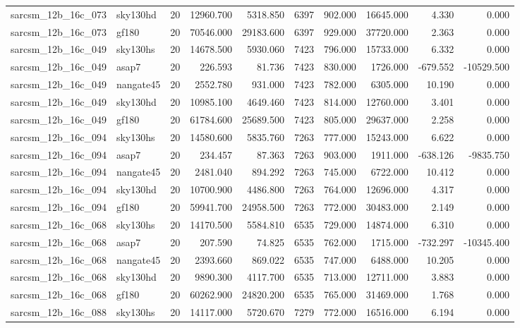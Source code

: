\begin{longtable}{llrrrrrrrr}
sarcsm\_12b\_16c\_073 & sky130hd & 20 & 12960.700 & 5318.850 & 6397 & 902.000 & 16645.000 & 4.330 & 0.000 \\
sarcsm\_12b\_16c\_073 & gf180 & 20 & 70546.000 & 29183.600 & 6397 & 929.000 & 37720.000 & 2.363 & 0.000 \\
sarcsm\_12b\_16c\_049 & sky130hs & 20 & 14678.500 & 5930.060 & 7423 & 796.000 & 15733.000 & 6.332 & 0.000 \\
sarcsm\_12b\_16c\_049 & asap7 & 20 & 226.593 & 81.736 & 7423 & 830.000 & 1726.000 & -679.552 & -10529.500 \\
sarcsm\_12b\_16c\_049 & nangate45 & 20 & 2552.780 & 931.000 & 7423 & 782.000 & 6305.000 & 10.190 & 0.000 \\
sarcsm\_12b\_16c\_049 & sky130hd & 20 & 10985.100 & 4649.460 & 7423 & 814.000 & 12760.000 & 3.401 & 0.000 \\
sarcsm\_12b\_16c\_049 & gf180 & 20 & 61784.600 & 25689.500 & 7423 & 805.000 & 29637.000 & 2.258 & 0.000 \\
sarcsm\_12b\_16c\_094 & sky130hs & 20 & 14580.600 & 5835.760 & 7263 & 777.000 & 15243.000 & 6.622 & 0.000 \\
sarcsm\_12b\_16c\_094 & asap7 & 20 & 234.457 & 87.363 & 7263 & 903.000 & 1911.000 & -638.126 & -9835.750 \\
sarcsm\_12b\_16c\_094 & nangate45 & 20 & 2481.040 & 894.292 & 7263 & 745.000 & 6722.000 & 10.412 & 0.000 \\
sarcsm\_12b\_16c\_094 & sky130hd & 20 & 10700.900 & 4486.800 & 7263 & 764.000 & 12696.000 & 4.317 & 0.000 \\
sarcsm\_12b\_16c\_094 & gf180 & 20 & 59941.700 & 24958.500 & 7263 & 772.000 & 30483.000 & 2.149 & 0.000 \\
sarcsm\_12b\_16c\_068 & sky130hs & 20 & 14170.500 & 5584.810 & 6535 & 729.000 & 14874.000 & 6.310 & 0.000 \\
sarcsm\_12b\_16c\_068 & asap7 & 20 & 207.590 & 74.825 & 6535 & 762.000 & 1715.000 & -732.297 & -10345.400 \\
sarcsm\_12b\_16c\_068 & nangate45 & 20 & 2393.660 & 869.022 & 6535 & 747.000 & 6488.000 & 10.205 & 0.000 \\
sarcsm\_12b\_16c\_068 & sky130hd & 20 & 9890.300 & 4117.700 & 6535 & 713.000 & 12711.000 & 3.883 & 0.000 \\
sarcsm\_12b\_16c\_068 & gf180 & 20 & 60262.900 & 24820.200 & 6535 & 765.000 & 31469.000 & 1.768 & 0.000 \\
sarcsm\_12b\_16c\_088 & sky130hs & 20 & 14117.000 & 5720.670 & 7279 & 772.000 & 16516.000 & 6.194 & 0.000 \\

\end{longtable}
